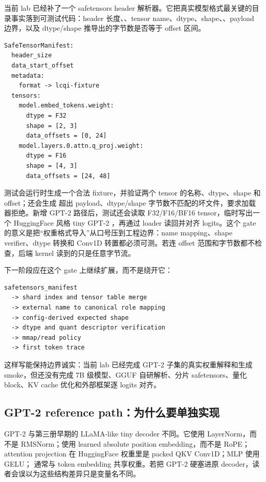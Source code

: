 当前 lab 已经补了一个 safetensors header 解析器。它把真实模型格式最关键的目录事实落到可测试代码：header 长度、、tensor name、dtype、shape、、payload 边界，以及 dtype/shape 推导出的字节数是否等于 offset 区间。

\begin{lstlisting}[numbers=none,caption={safetensors manifest gate 的最小证据}]
SafeTensorManifest:
  header_size
  data_start_offset
  metadata:
    format -> lcqi-fixture
  tensors:
    model.embed_tokens.weight:
      dtype = F32
      shape = [2, 3]
      data_offsets = [0, 24]
    model.layers.0.attn.q_proj.weight:
      dtype = F16
      shape = [4, 3]
      data_offsets = [24, 48]
\end{lstlisting}

测试会运行时生成一个合法 fixture，并验证两个 tensor 的名称、dtype、shape 和 offset；还会生成  超出 payload、dtype/shape 字节数不匹配的坏文件，要求加载器拒绝。新增 GPT-2 路径后，测试还会读取 F32/F16/BF16 tensor，临时写出一个 HuggingFace 风格 tiny GPT-2 ，再通过 loader 读回并对齐 logits。这个 gate 的意义是把“权重格式导入”从口号压到工程边界：name mapping、shape verifier、dtype 转换和 Conv1D 转置都必须可测。若连 offset 范围和字节数都不检查，后端 kernel 读到的只是任意字节流。

下一阶段应在这个 gate 上继续扩展，而不是绕开它：

\begin{lstlisting}[numbers=none,caption={从 safetensors header 到真实加载器的下一层}]
safetensors_manifest
  -> shard index and tensor table merge
  -> external name to canonical role mapping
  -> config-derived expected shape
  -> dtype and quant descriptor verification
  -> mmap/read policy
  -> first token trace
\end{lstlisting}

这样写能保持边界诚实：当前 lab 已经完成 GPT-2 子集的真实权重解释和生成 smoke，但还没有完成 7B 级模型、GGUF 自研解析、分片 safetensors、量化 block、KV cache 优化和外部框架逐 logits 对齐。

\subsection{GPT-2 reference path：为什么要单独实现}

GPT-2 与第三册早期的 LLaMA-like tiny decoder 不同。它使用 LayerNorm，而不是 RMSNorm；使用 learned absolute position embedding，而不是 RoPE；attention projection 在 HuggingFace 权重里是 packed QKV Conv1D；MLP 使用 GELU； 通常与 token embedding 共享权重。若把 GPT-2 硬塞进原 decoder，读者会误以为这些结构差异只是变量名不同。

